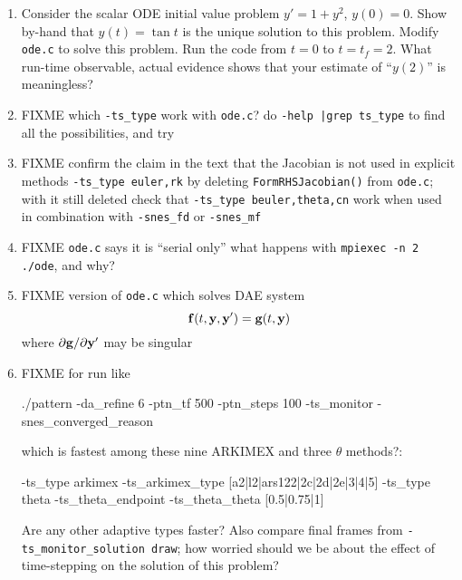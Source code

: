 \renewcommand{\labelenumi}{\arabic{chapter}.\arabic{enumi}\quad}
\renewcommand{\labelenumii}{(\alph{enumii})}
\begin{enumerate}
\item \label{exer:ts:tan}  Consider the scalar ODE initial value problem $y'=1+y^2$, $y(0)=0$.  Show by-hand that $y(t)=\tan t$ is the unique solution to this problem.  Modify \texttt{ode.c} to solve this problem.  Run the code from $t=0$ to $t=t_f=2$.  What run-time observable, actual evidence shows that your estimate of ``$y(2)$'' is meaningless?
\item FIXME which \texttt{-ts\_type} work with \texttt{ode.c}?  do \texttt{-help |grep ts\_type} to find all the possibilities, and try 
\item FIXME confirm the claim in the text that the Jacobian is not used in explicit methods \texttt{-ts\_type euler,rk} by deleting \texttt{FormRHSJacobian()} from \texttt{ode.c}; with it still deleted check that \texttt{-ts\_type beuler,theta,cn} work when used in combination with \texttt{-snes\_fd} or \texttt{-snes\_mf}
\item FIXME \texttt{ode.c} says it is ``serial only''  what happens with \texttt{mpiexec -n 2 ./ode}, and why?
\item FIXME version of \texttt{ode.c} which solves DAE system
    $$\mathbf{f}(t,\mathbf{y},\mathbf{y}') = \mathbf{g}(t,\mathbf{y})$$
where $\partial \mathbf{g}/\partial \mathbf{y}'$ may be singular
\item FIXME for run like
\begin{cline}
./pattern -da_refine 6 -ptn_tf 500 -ptn_steps 100 -ts_monitor -snes_converged_reason
\end{cline}
which is fastest among these nine ARKIMEX and three $\theta$ methods?:
\begin{code}
-ts_type arkimex -ts_arkimex_type [a2|l2|ars122|2c|2d|2e|3|4|5]
-ts_type theta -ts_theta_endpoint -ts_theta_theta [0.5|0.75|1]
\end{code}
Are any other adaptive \pTS types faster?  Also compare final frames from \texttt{-ts\_monitor\_solution draw}; how worried should we be about the effect of time-stepping on the solution of this problem?
\end{enumerate}
